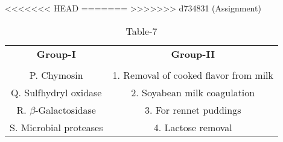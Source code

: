 \begin{table}[htbp]
  \centering
  \caption{Table-7}
<<<<<<< HEAD
  \label{tab:tables/table7.tex}
=======
  \label{table7}
>>>>>>> d734831 (Assignment)
  \begin{tabular}{cc}
  \textbf{Group-I} & \textbf{Group-II} \\ \\
    P. Chymosin & 1. Removal of cooked flavor from milk \\
    Q. Sulfhydryl oxidase & 2. Soyabean milk coagulation \\
    R. $\beta$-Galactosidase & 3. For rennet puddings \\
    S. Microbial proteases & 4. Lactose removal \\
  \end{tabular}
\end{table}